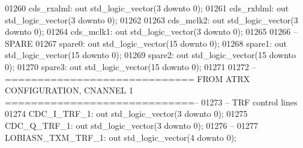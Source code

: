 \begin{DoxyCode}
01260         cds\_rxalml: \textcolor{keywordflow}{out} \textcolor{comment}{std\_logic\_vector}(\textcolor{vhdllogic}{}\textcolor{vhdllogic}{3} \textcolor{keywordflow}{downto} \textcolor{vhdllogic}{}\textcolor{vhdllogic}{0});
01261         cds\_rxblml: \textcolor{keywordflow}{out} \textcolor{comment}{std\_logic\_vector}(\textcolor{vhdllogic}{}\textcolor{vhdllogic}{3} \textcolor{keywordflow}{downto} \textcolor{vhdllogic}{}\textcolor{vhdllogic}{0});
01262 
01263         cds\_mclk2:  \textcolor{keywordflow}{out} \textcolor{comment}{std\_logic\_vector}(\textcolor{vhdllogic}{}\textcolor{vhdllogic}{3} \textcolor{keywordflow}{downto} \textcolor{vhdllogic}{}\textcolor{vhdllogic}{0});
01264         cds\_mclk1:  \textcolor{keywordflow}{out} \textcolor{comment}{std\_logic\_vector}(\textcolor{vhdllogic}{}\textcolor{vhdllogic}{3} \textcolor{keywordflow}{downto} \textcolor{vhdllogic}{}\textcolor{vhdllogic}{0});
01265 
01266 \textcolor{keyword}{        -- SPARE}
01267         spare0: \textcolor{keywordflow}{out} \textcolor{comment}{std\_logic\_vector}(\textcolor{vhdllogic}{}\textcolor{vhdllogic}{15} \textcolor{keywordflow}{downto} \textcolor{vhdllogic}{}\textcolor{vhdllogic}{0});
01268         spare1: \textcolor{keywordflow}{out} \textcolor{comment}{std\_logic\_vector}(\textcolor{vhdllogic}{}\textcolor{vhdllogic}{15} \textcolor{keywordflow}{downto} \textcolor{vhdllogic}{}\textcolor{vhdllogic}{0});
01269         spare2: \textcolor{keywordflow}{out} \textcolor{comment}{std\_logic\_vector}(\textcolor{vhdllogic}{}\textcolor{vhdllogic}{15} \textcolor{keywordflow}{downto} \textcolor{vhdllogic}{}\textcolor{vhdllogic}{0});
01270         spare3: \textcolor{keywordflow}{out} \textcolor{comment}{std\_logic\_vector}(\textcolor{vhdllogic}{}\textcolor{vhdllogic}{15} \textcolor{keywordflow}{downto} \textcolor{vhdllogic}{}\textcolor{vhdllogic}{0});
01271         
01272 \textcolor{keyword}{        --============================= FROM ATRX CONFIGURATION, CNANNEL 1 =============================--}
01273 \textcolor{keyword}{        -- TRF control lines}
01274         CDC\_I\_TRF\_1:        \textcolor{keywordflow}{out} \textcolor{comment}{std\_logic\_vector}(\textcolor{vhdllogic}{}\textcolor{vhdllogic}{3} \textcolor{keywordflow}{downto} \textcolor{vhdllogic}{}\textcolor{vhdllogic}{0});
01275         CDC\_Q\_TRF\_1:        \textcolor{keywordflow}{out} \textcolor{comment}{std\_logic\_vector}(\textcolor{vhdllogic}{}\textcolor{vhdllogic}{3} \textcolor{keywordflow}{downto} \textcolor{vhdllogic}{}\textcolor{vhdllogic}{0});
01276 \textcolor{keyword}{        --}
01277         LOBIASN\_TXM\_TRF\_1:  \textcolor{keywordflow}{out} \textcolor{comment}{std\_logic\_vector}(\textcolor{vhdllogic}{}\textcolor{vhdllogic}{4} \textcolor{keywordflow}{downto} \textcolor{vhdllogic}{}\textcolor{vhdllogic}{0});

\end{DoxyCode}
